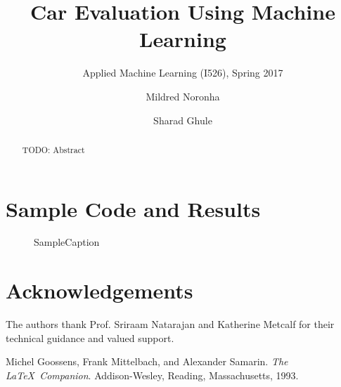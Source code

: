 \documentclass[sigconf]{acmart}
\begin{document}
\title{Car Evaluation Using Machine Learning}
\subtitle{Applied Machine Learning (I526), Spring 2017}
\author{Mildred Noronha}

\author{Sharad Ghule}
\begin{abstract}
TODO: Abstract
\end{abstract}
\maketitle










\appendix
\section{Sample Code and Results}

\begin{figure}
\centering
{}
\caption{SampleCaption}
\label{fig:SampleCaption}
\end{figure}


\section{Acknowledgements}
 The authors thank Prof. Sriraam Natarajan and Katherine Metcalf for their technical guidance and valued support.

\medskip
 
\begin{thebibliography}{9}
Michel Goossens, Frank Mittelbach, and Alexander Samarin. 
\textit{The \LaTeX\ Companion}. 
Addison-Wesley, Reading, Massachusetts, 1993.
\end{thebibliography}
\end{document}
